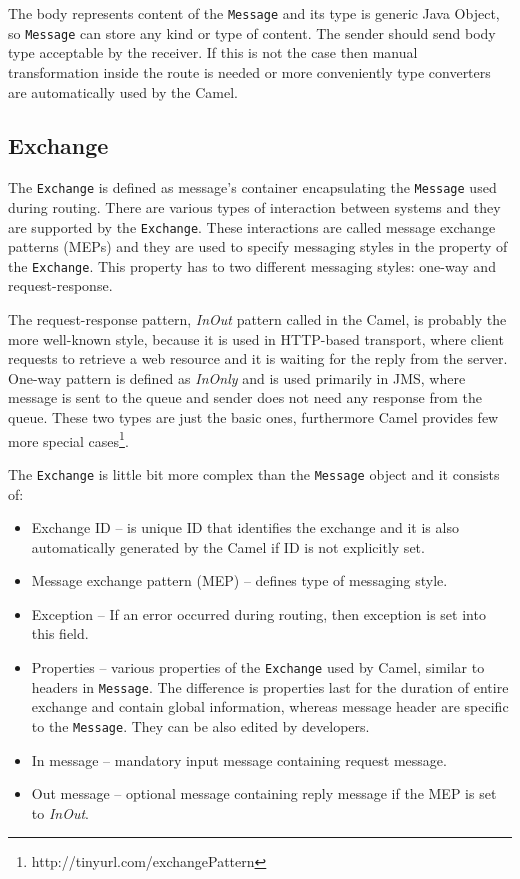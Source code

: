 \documentclass[12pt,final,oneside]{fithesis2}
\begin{document}
The body represents content of the \texttt{Message} and its type is generic Java Object, so \texttt{Message} can store any kind or type of content. The sender should send body type acceptable by the receiver. If this is not the case then manual transformation inside the route is needed or more conveniently type converters are automatically used by the Camel.


\subsection*{Exchange}
The \texttt{Exchange} is defined as message's container encapsulating the \texttt{Message} used during routing. There are various types of interaction between systems and they are supported by the \texttt{Exchange}. These interactions are called message exchange patterns (MEPs) and they are used to specify messaging styles in the property of the  \texttt{Exchange}. This property has to two different messaging styles: one-way and request-response. 

The request-response pattern, \textit{InOut} pattern called in the Camel, is probably the more well-known style, because it is used in HTTP-based transport, where client requests to retrieve a web resource and it is waiting for the reply from the server. One-way pattern is defined as \textit{InOnly} and is used primarily in JMS, where message is sent to the queue and sender does not need any response from the queue. These two types are just the basic ones, furthermore Camel provides few more special cases\footnote{http://tinyurl.com/exchangePattern}.\cite{camel-exchange}

The \texttt{Exchange} is little bit more complex than the \texttt{Message} object and it consists of\cite{camel-in-action}:
\begin{itemize}
\item
Exchange ID -- is unique ID that identifies the exchange and it is also automatically generated by the Camel if ID is not explicitly set.

\item
Message exchange pattern (MEP) -- defines type of messaging style.

\item
Exception -- If an error occurred during routing, then exception is set into this field.

\item
Properties -- various properties of the \texttt{Exchange} used by Camel, similar to headers in \texttt{Message}. The difference is properties last for the duration of entire exchange and contain global information, whereas message header are specific to the \texttt{Message}. They can be also edited by developers.

\item
In message -- mandatory input message containing request message.

\item
Out message -- optional message containing reply message if the MEP is set to \textit{InOut}.
\end{itemize}
\end{document}
